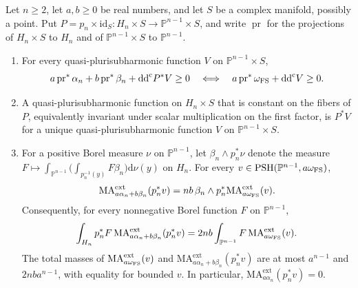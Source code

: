 \begin{lemma}\label{lem:hopf-basic-potentials}\label{thm:hopf-descended-hermitian-ma}
Let $n\geq2$, let $a,b\geq0$ be real numbers, and let $S$ be a complex manifold, possibly a point. Put $P=p_n\times\mathrm{id}_S\colon H_n\times S\to\mathbb P^{n-1}\times S$, and write $\operatorname{pr}$ for the projections of $H_n\times S$ to $H_n$ and of $\mathbb P^{n-1}\times S$ to $\mathbb P^{n-1}$.
\begin{enumerate}
\item For every quasi-plurisubharmonic function $V$ on $\mathbb P^{n-1}\times S$,
\[
 a\operatorname{pr}^*\alpha_n+b\operatorname{pr}^*\beta_n+\mathrm{dd}^{\mathrm{c}} P^*V\geq0
 \quad\Longleftrightarrow\quad
 a\operatorname{pr}^*\omega_{\mathrm{FS}}+\mathrm{dd}^{\mathrm{c}} V\geq0.
\]
\item A quasi-plurisubharmonic function on $H_n\times S$ that is constant on the fibers of $P$, equivalently invariant under scalar multiplication on the first factor, is $P^*V$ for a unique quasi-plurisubharmonic function $V$ on $\mathbb P^{n-1}\times S$.
\item For a positive Borel measure $\nu$ on $\mathbb P^{n-1}$, let $\beta_n\wedge p_n^*\nu$ denote the measure $F\mapsto\int_{\mathbb P^{n-1}}\bigl(\int_{p_n^{-1}(y)}F\beta_n\bigr)\mathrm d\nu(y)$ on $H_n$. For every $v\in\mathrm{PSH}(\mathbb P^{n-1},a\omega_{\mathrm{FS}})$,
\[
 \mathrm{MA}^{\mathrm{ext}}_{a\alpha_n+b\beta_n}(p_n^*v)
 =nb\,\beta_n\wedge p_n^*\mathrm{MA}^{\mathrm{ext}}_{a\omega_{\mathrm{FS}}}(v).
\]
Consequently, for every nonnegative Borel function $F$ on $\mathbb P^{n-1}$,
\[
 \int_{H_n}p_n^*F\,\mathrm{MA}^{\mathrm{ext}}_{a\alpha_n+b\beta_n}(p_n^*v)
 =2nb\int_{\mathbb P^{n-1}}F\,\mathrm{MA}^{\mathrm{ext}}_{a\omega_{\mathrm{FS}}}(v).
\]
The total masses of $\mathrm{MA}^{\mathrm{ext}}_{a\omega_{\mathrm{FS}}}(v)$ and $\mathrm{MA}^{\mathrm{ext}}_{a\alpha_n+b\beta_n}(p_n^*v)$ are at most $a^{n-1}$ and $2nba^{n-1}$, with equality for bounded $v$. In particular, $\mathrm{MA}^{\mathrm{ext}}_{a\alpha_n}(p_n^*v)=0$.
\end{enumerate}
\end{lemma}
